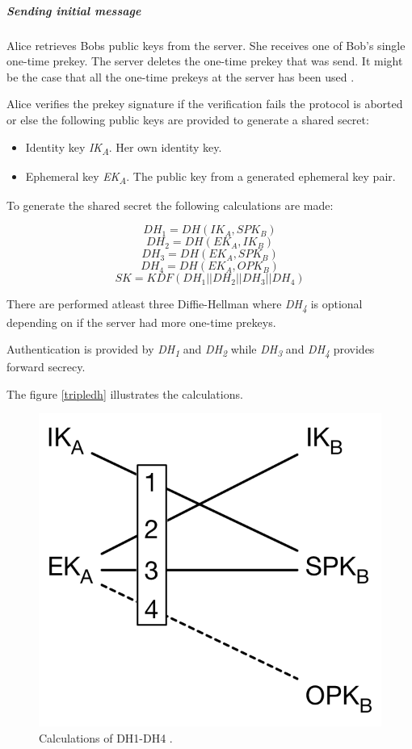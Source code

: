 \subparagraph{Sending initial message}
Alice retrieves Bobs public keys from the server. She receives one of Bob's single one-time prekey. The server deletes the one-time prekey that was send. It might be the case that all the one-time prekeys at the server has been used \cite{tripledh}.  


Alice verifies the prekey signature if the verification fails the protocol is aborted or else the following public keys are provided to generate a shared secret:

\begin{itemize}
	\item Identity key \emph{IK\textsubscript{A}}. Her own identity key. 
	\item Ephemeral key \emph{EK\textsubscript{A}}. The public key from a generated ephemeral key pair.
\end{itemize}


To generate the shared secret the following calculations are made:

\[DH_1 = DH(IK_A, SPK_B)\]
\[DH_2 = DH(EK_A, IK_B) \]
\[DH_3 = DH(EK_A, SPK_B)\]
\[DH_4 = DH(EK_A, OPK_B)\]
\[SK = KDF(DH_1 || DH_2 || DH_3 || DH_4)\]

There are performed atleast three Diffie-Hellman where \emph{DH\textsubscript{4}} is optional depending on if the server had more one-time prekeys.

Authentication is provided by \emph{DH\textsubscript{1}} and \emph{DH\textsubscript{2}} while \emph{DH\textsubscript{3}} and \emph{DH\textsubscript{4}} provides forward secrecy.

The figure \ref{tripledh} illustrates the calculations. 


\begin{figure}[H]
	\centering
	\includegraphics{figures/tripledh.png}
	\caption{Calculations of DH1-DH4 \cite{tripledh}.}
	\label{fig:tripledh}
\end{figure}


